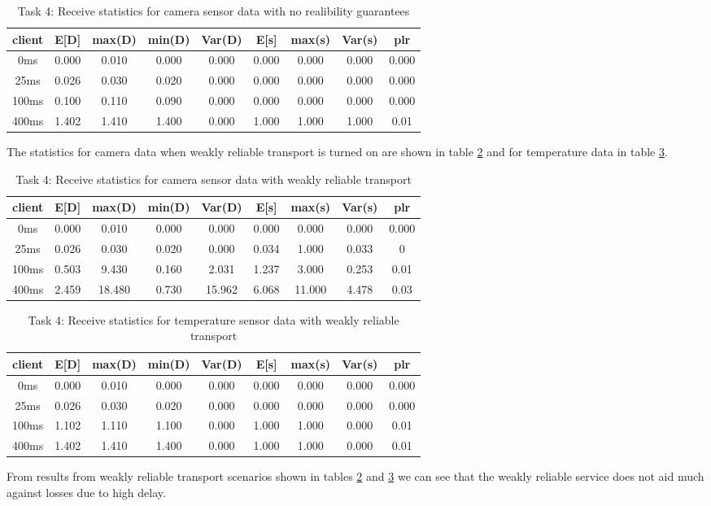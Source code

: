 \begin{table}
\centering
\begin{tabular}{|c|c|c|c|c|c|c|c|c|}
\hline
client & E[D] & max(D) & min(D) & Var(D) & E[s] & max(s) & Var(s) & plr\\
\hline
0ms & 0.000 & 0.010 & 0.000 & 0.000 & 0.000 & 0.000 & 0.000 & 0.000 \\
\hline
25ms & 0.026 & 0.030 & 0.020 & 0.000 & 0.000 & 0.000 & 0.000 & 0.000 \\
\hline
100ms & 0.100 & 0.110 & 0.090 & 0.000 & 0.000 & 0.000 & 0.000 & 0.000 \\
\hline
400ms &  1.402 & 1.410 & 1.400 & 0.000 & 1.000 & 1.000 & 1.000 & 0.01 \\
\hline
\end{tabular}
\caption{Task 4: Receive statistics for camera sensor data with no realibility guarantees}
\label{table:task4-temp-a}
\end{table}



The statistics for camera data when weakly reliable transport is turned on are shown in table
\ref{table:task4-camera-b} and for temperature data in table
\ref{table:task4-temp-b}. 

\begin{table}
\centering
\begin{tabular}{|c|c|c|c|c|c|c|c|c|}
\hline
client & E[D] & max(D) & min(D) & Var(D) & E[s] & max(s) & Var(s) & plr\\
\hline
0ms & 0.000 & 0.010 & 0.000 & 0.000 & 0.000 & 0.000 & 0.000 & 0.000 \\
\hline 
25ms & 0.026 & 0.030 & 0.020 & 0.000 & 0.034 & 1.000 & 0.033 & 0 \\
\hline
100ms & 0.503 & 9.430 & 0.160 & 2.031 & 1.237 & 3.000 & 0.253 & 0.01\\
\hline
400ms & 2.459 & 18.480 & 0.730 & 15.962 & 6.068 & 11.000 & 4.478 & 0.03   \\
\hline
\end{tabular}
\caption{Task 4: Receive statistics for camera sensor data with weakly reliable transport}
\label{table:task4-camera-b}
\end{table}


\begin{table}
\centering
\begin{tabular}{|c|c|c|c|c|c|c|c|c|}
\hline
client & E[D] & max(D) & min(D) & Var(D) & E[s] & max(s) & Var(s) & plr\\
\hline
0ms & 0.000 & 0.010 & 0.000 & 0.000 & 0.000 & 0.000 & 0.000 & 0.000 \\
\hline
25ms & 0.026 & 0.030 & 0.020 & 0.000 & 0.000 & 0.000 & 0.000 & 0.000 \\
\hline
100ms & 1.102 & 1.110 & 1.100 & 0.000 & 1.000 & 1.000 & 0.000 & 0.01 \\
\hline
400ms & 1.402 & 1.410 & 1.400 & 0.000 & 1.000 & 1.000 & 0.000 & 0.01\\
\hline
\end{tabular}
\caption{Task 4: Receive statistics for temperature sensor data with weakly reliable transport}
\label{table:task4-temp-b}
\end{table}

From results from weakly reliable transport scenarios  shown in tables
\ref{table:task4-camera-b} and \ref{table:task4-temp-b} we can see that the
weakly reliable service does not aid much against losses due to high delay.
